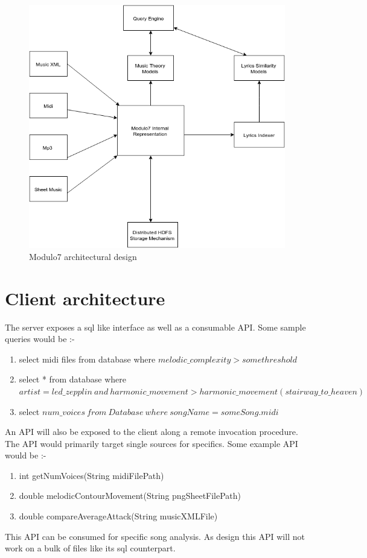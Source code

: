 \begin{figure}[t]
\centering
\includegraphics[width=\textwidth]{Modulo7Architecture.png}
\makeatletter
\let\@currsize\normalsize
\caption{Modulo7 architectural design}
\label{fig:figure}
\end{figure}
\section{Client architecture}
The server exposes a sql like interface as well as a consumable API. Some sample queries would be :-
\begin{enumerate}
\item select midi files from database where $melodic\_complexity > some threshold$
\item select * from database where $artist = led\_zepplin \ and \ harmonic\_movement > harmonic\_movement(stairway\_to\_heaven)$
\item select $ num\_voices \ from \ Database \ where \ songName = someSong.midi$ 
\end{enumerate}

An API will also be exposed to the client along a remote invocation procedure. The API would primarily target single sources for specifics. Some example API would be :-
\begin{enumerate}
\item int getNumVoices(String midiFilePath)
\item double melodicContourMovement(String pngSheetFilePath)
\item double compareAverageAttack(String musicXMLFile)
\end{enumerate}

This API can be consumed for specific song analysis. As design this API will not work on a bulk of files like its sql counterpart. 